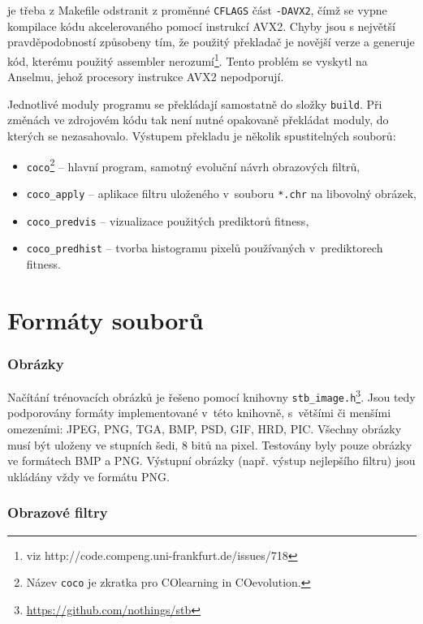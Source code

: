 \noindent{}je třeba z Makefile odstranit z proměnné \texttt{CFLAGS} část \texttt{-DAVX2}, čímž se vypne kompilace kódu akcelerovaného pomocí instrukcí AVX2. Chyby jsou s největší pravděpodobností způsobeny tím, že použitý překladač je novější verze a generuje kód, kterému použitý assembler nerozumí\footnote{viz http://code.compeng.uni-frankfurt.de/issues/718}. Tento problém se vyskytl na Anselmu, jehož procesory instrukce AVX2 nepodporují.

Jednotlivé moduly programu se překládají samostatně do složky \texttt{build}. Při změnách ve zdrojovém kódu tak není nutné opakovaně překládat moduly, do kterých se nezasahovalo. Výstupem překladu je několik spustitelných souborů:

\begin{itemize}
    \item \texttt{coco}\footnote{Název \texttt{coco} je zkratka pro COlearning in COevolution.} -- hlavní program, samotný evoluční návrh obrazových filtrů,
    \item \texttt{coco\_apply} -- aplikace filtru uloženého v~souboru \texttt{*.chr} na libovolný obrázek,
    \item \texttt{coco\_predvis} -- vizualizace použitých prediktorů fitness,
    \item \texttt{coco\_predhist} -- tvorba histogramu pixelů používaných v~prediktorech fitness.
\end{itemize}

\section{Formáty souborů}

\subsubsection*{Obrázky}

Načítání trénovacích obrázků je řešeno pomocí knihovny \texttt{stb\_image.h}\footnote{\url{https://github.com/nothings/stb}}. Jsou tedy podporovány formáty implementované v~této knihovně, s~většími či menšími omezeními: JPEG, PNG, TGA, BMP, PSD, GIF, HRD, PIC. Všechny obrázky musí být uloženy ve stupních šedi, 8 bitů na pixel. Testovány byly pouze obrázky ve formátech BMP a PNG. Výstupní obrázky (např. výstup nejlepšího filtru) jsou ukládány vždy ve formátu PNG.

\subsubsection*{Obrazové filtry}

